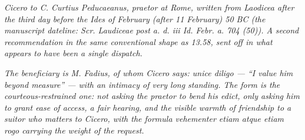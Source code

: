 
\textit{Cicero to C. Curtius Peducaeanus, praetor at Rome, written
from Laodicea after the third day before the Ides of February (after
11 February) 50 BC (the manuscript dateline: \textit{Scr. Laudiceae
post a. d. iii Id. Febr. a. 704 (50)}). A second recommendation in
the same conventional shape as 13.58, sent off in what appears to
have been a single dispatch.}

\textit{The beneficiary is M. Fadius, of whom Cicero says: \textit{unice
diligo} --- ``I value him beyond measure'' --- with an intimacy of
very long standing. The form is the courteous-restrained one: not
asking the praetor to bend his edict, only asking him to grant ease
of access, a fair hearing, and the visible warmth of friendship to a
suitor who matters to Cicero, with the formula \textit{vehementer
etiam atque etiam rogo} carrying the weight of the request.}
